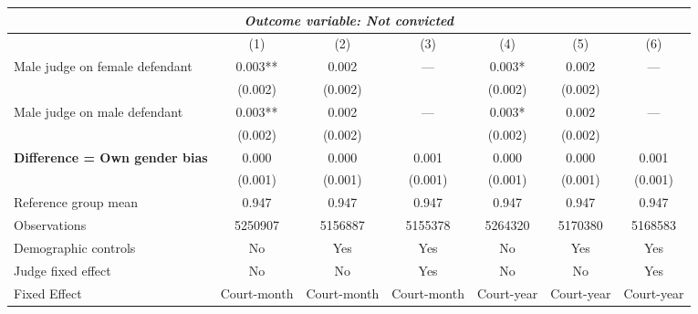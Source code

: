 {
\def\sym#1{\ifmmode^{#1}\else\(^{#1}\)\fi}
\begin{tabular}{l*{6}{c}}
  \hline\hline
\multicolumn{7}{c}{\textit{Outcome variable: Not convicted}}\\
\hline
&\multicolumn{1}{c}{(1)}&\multicolumn{1}{c}{(2)}&\multicolumn{1}{c}{(3)}&\multicolumn{1}{c}{(4)}&\multicolumn{1}{c}{(5)}&\multicolumn{1}{c}{(6)}\\
\hline
Male judge on female defendant \hspace{15mm} & 0.003** & 0.002 & --- & 0.003* & 0.002 & --- \\
& (0.002) & (0.002) &  & (0.002) &(0.002) &  \\
Male judge on male defendant \hspace{15mm} & 0.003** & 0.002 & ---& 0.003* & 0.002 & --- \\
& (0.002) & (0.002) &  & (0.002) & (0.002) &  \\
\textbf{Difference = Own gender bias} \hspace{15mm} & 0.000 & 0.000 & 0.001 & 0.000 & 0.000 & 0.001 \\
& (0.001) & (0.001) & (0.001) & (0.001) & (0.001) & (0.001) \\
\hline
Reference group mean & 0.947 & 0.947 & 0.947 & 0.947 & 0.947 & 0.947 \\
Observations & 5250907 & 5156887 & 5155378 & 5264320 & 5170380 & 5168583 \\
Demographic controls & No & Yes & Yes & No & Yes & Yes \\
Judge fixed effect & No & No & Yes & No & No & Yes \\
Fixed Effect & Court-month & Court-month & Court-month & Court-year & Court-year & Court-year \\
\hline\hline
\end{tabular}
}
 
